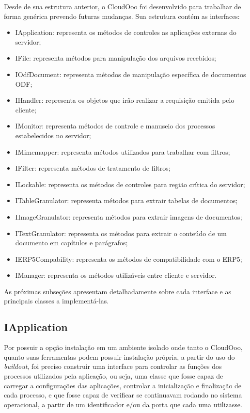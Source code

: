 Desde de sua estrutura anterior, o CloudOoo foi desenvolvido para trabalhar de forma genérica prevendo futuras mudanças. Sua estrutura contém as interfaces:

\begin{itemize}
    \item{IApplication: representa os métodos de controles as aplicações externas do servidor;}
    \item{IFile: representa métodos para manipulação dos arquivos recebidos;}
    \item{IOdfDocument: representa métodos de manipulação específica de documentos ODF;}
    \item{IHandler: representa os objetos que irão realizar a requisição emitida pelo cliente;}
    \item{IMonitor: representa métodos de controle e manuseio dos processos estabelecidos no servidor;}
    \item{IMimemapper: representa métodos utilizados para trabalhar com filtros;}
    \item{IFilter: representa métodos de tratamento de filtros;}
    \item{ILockable: representa os métodos de controles para região crítica do servidor;}
    \item{ITableGranulator: representa métodos para extrair tabelas de documentos;}
    \item{IImageGranulator: representa métodos para extrair imagens de documentos;}
    \item{ITextGranulator: representa os métodos para extrair o conteúdo de um documento em capítulos e parágrafos;}
    \item{IERP5Compability: representa os métodos de compatibilidade com o ERP5;}
    \item{IManager: representa os métodos utilizáveis entre cliente e servidor.}
\end{itemize}

As próximas subseções apresentam detalhadamente sobre cada interface e as principais classes a implementá-las.


\subsection{IApplication}
\label{iapplication}

Por possuir a opção instalação em um ambiente isolado onde tanto o CloudOoo, quanto suas ferramentas podem possuir instalação própria, a partir do uso do \textit{buildout}, foi preciso construir uma interface para controlar as funções dos processos utilizados pela aplicação, ou seja, uma classe que fosse capaz de carregar a configurações das aplicações, controlar a inicialização e finalização de cada processo, e que fosse capaz de verificar se continuavam rodando no sistema operacional, a partir de um identificador e/ou da porta que cada uma utilizasse.


